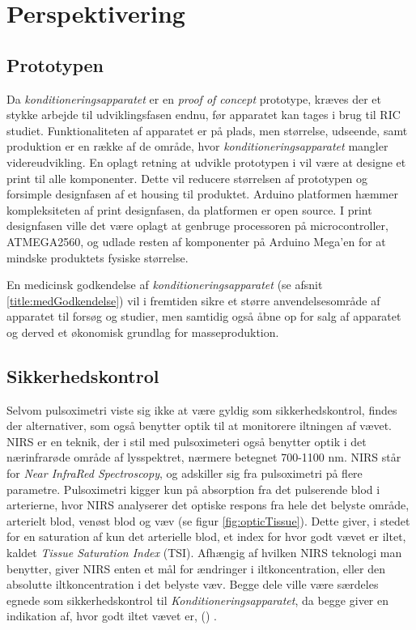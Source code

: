 \chapter{Perspektivering} 

\section{Prototypen}
Da \textit{konditioneringsapparatet} er en \textit{proof of concept} prototype, kræves der et stykke arbejde til udviklingsfasen endnu, før apparatet kan tages i brug til RIC studiet. Funktionaliteten af apparatet er på plads, men størrelse, udseende, samt produktion er en række af de område, hvor \textit{konditioneringsapparatet} mangler videreudvikling. En oplagt retning at udvikle prototypen i vil være at designe et print til alle komponenter. Dette vil reducere størrelsen af prototypen og forsimple designfasen af et housing til produktet. Arduino platformen hæmmer kompleksiteten af print designfasen, da platformen er open source. I print designfasen ville det være oplagt at genbruge processoren på microcontroller, ATMEGA2560, og udlade resten af komponenter på Arduino Mega'en for at mindske produktets fysiske størrelse. 

En medicinsk godkendelse af \textit{konditioneringsapparatet} (se afsnit \ref{title:medGodkendelse}) vil i fremtiden sikre et større anvendelsesområde af apparatet til forsøg og studier, men samtidig også åbne op for salg af apparatet og derved et økonomisk grundlag for masseproduktion.

\section{Sikkerhedskontrol}\label{title:nirs}
Selvom pulsoximetri viste sig ikke at være gyldig som sikkerhedskontrol, findes der alternativer, som også benytter optik til at monitorere iltningen af vævet. NIRS er en teknik, der i stil med pulsoximeteri også benytter optik i det nærinfrarøde område af lysspektret, nærmere betegnet 700-1100 nm. NIRS står for \textit{Near InfraRed Spectroscopy}, og adskiller sig fra pulsoximetri på flere parametre. Pulsoximetri kigger kun på absorption fra det pulserende blod i arterierne, hvor NIRS analyserer det optiske respons fra hele det belyste område, arterielt blod, venøst blod og væv (se figur \ref{fig:opticTissue}). Dette giver, i stedet for en saturation af kun det arterielle blod, et index for hvor godt vævet er iltet, kaldet \textit{Tissue Saturation Index} (TSI). Afhængig af hvilken NIRS teknologi man benytter, giver NIRS enten et mål for ændringer i iltkoncentration, eller den absolutte iltkoncentration i det belyste væv. Begge dele ville være særdeles egnede som sikkerhedskontrol til \textit{Konditioneringsapparatet}, da begge giver en indikation af, hvor godt iltet vævet er, (\cite{RefWorks:22}) .

